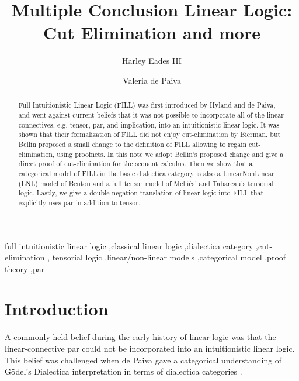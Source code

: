\documentclass{elsarticle}
\title{Multiple Conclusion Linear Logic: \\ Cut Elimination and more}
\author[au]{Harley Eades III\corref{cor1}}
\author[nuance]{Valeria de Paiva}
\date{}
\begin{document}

\newcommand{\rcond}[0]{\refstepcounter{condCounter}\arabic{condCounter}}

\begin{abstract}
  Full Intuitionistic Linear Logic (FILL) was first introduced by
  Hyland and de Paiva, and went against current beliefs that it was
  not possible to incorporate all of the linear connectives,
  e.g. tensor, par, and implication, into an intuitionistic linear
  logic. It was shown that their formalization of FILL did not enjoy
  cut-elimination by Bierman, but Bellin proposed a small change to the
  definition of FILL allowing to regain cut-elimination, using proofnets.  
  In this note we adopt Bellin's proposed change and give a direct proof of
  cut-elimination for the sequent calculus.  
  Then we show that a categorical model of FILL in
  the basic dialectica category is also a LinearNonLinear (LNL)
  model of Benton and a
  full tensor model of Melli\`es' and Tabareau's tensorial logic.
  Lastly, we give a double-negation translation of linear logic into
  FILL that explicitly uses par in addition to tensor.
\end{abstract}

\begin{keyword}
full intuitionistic linear logic \sep classical linear
  logic \sep dialectica category \sep cut-elimination \sep
  tensorial logic \sep linear/non-linear models \sep categorical
  model \sep proof theory \sep par
\end{keyword}

\maketitle

\section{Introduction}
\label{sec:introduction}

A commonly held belief during the early history of linear logic was
that the linear-connective par could not be incorporated into an
intuitionistic linear logic.  This belief was challenged when de Paiva
gave a categorical understanding of G\"odel's Dialectica
interpretation in terms of dialectica categories
\cite{dePaiva:1987,dePaiva:1988}.  
\end{document}
